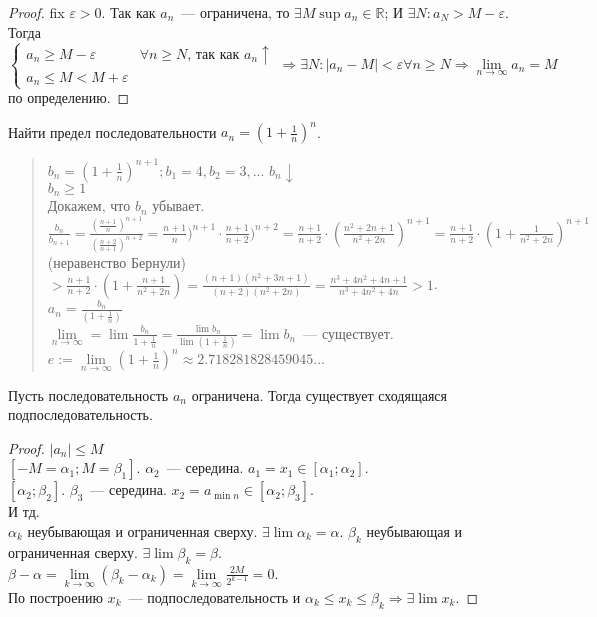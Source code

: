 \documentclass{article}
\begin{document}
	\begin{proof}
		fix $\varepsilon > 0$. Так как $a_n$~--- ограничена, то $\exists M  \sup a_n \in \mathbb{R}$; И $\exists N: a_N > M - \varepsilon$. \\
		Тогда $\begin{cases}
			a_n \geqslant M - \varepsilon & \forall n \geqslant N \text{, так как } a_n \uparrow \\
			a_n \leqslant M < M + \varepsilon
		\end{cases} \Rightarrow \exists N: |a_n - M| < \varepsilon \forall n \geqslant N \Rightarrow \lim\limits_{n \rightarrow \infty} a_n = M$ по определению.
	\end{proof}
	\begin{definition}
		Найти предел последовательности $a_n = (1 + \frac{1}{n})^n$.
		\begin{quote}
			$b_n = (1 + \frac{1}{n})^{n + 1}; b_1 = 4, b_2 = 3,...$ $b_n \downarrow$ \\
			$b_n \geqslant 1$ \\
			Докажем, что $b_n$ убывает. \\
			$\frac{b_n}{b_{n + 1}} = \frac{(\frac{n + 1}{n})^{n + 1}}{(\frac{n + 2}{n + 1})^{n + 2}} = \frac{n + 1}{n})^{n + 1} \cdot \frac{n + 1}{n + 2})^{n + 2} = \frac{n + 1}{n + 2} \cdot (\frac{n^2 + 2n + 1}{n^2 + 2n})^{n + 1} = \frac{n + 1}{n + 2} \cdot (1 + \frac{1}{n^2 + 2n})^{n + 1}$ (неравенство Бернули) $> \frac{n + 1}{n + 2} \cdot (1 + \frac{n + 1}{n^2 + 2n}) = \frac{(n + 1)(n^2 + 3n + 1)}{(n + 2)(n^2 + 2n)} = \frac{n^3 + 4n^2 + 4n + 1}{n^3 + 4n^2 + 4n} > 1$. \\
			$a_n = \frac{b_n}{(1 + \frac{1}{n})}$ \\
			$\lim\limits_{n \rightarrow \infty} = \lim \frac{b_n}{1 + \frac{1}{n}} = \frac{\lim b_n}{\lim (1 + \frac{1}{n})} = \lim b_n$~--- существует. \\
			$e := \lim\limits_{n \rightarrow \infty} (1 + \frac{1}{n})^n \approx 2.718281828459045...$
		\end{quote}
	\end{definition}
	\begin{theorem}[Вейерштрасса]
		Пусть последовательность $a_n$ ограничена. Тогда существует сходящаяся подпоследовательность.
	\end{theorem}
	\begin{proof}
		$|a_n| \leqslant M$ \\
		$[-M = \alpha_1; M = \beta_1]$. $\alpha_2$~--- середина. $a_1 = x_1 \in [\alpha_1; \alpha_2]$. \\
		$[\alpha_2; \beta_2]$. $\beta_3$~--- середина. $x_2 = a_{\min n} \in [\alpha_2; \beta_3]$. \\
		И тд. \\
		${\alpha_k}$ неубывающая и ограниченная сверху. $\exists \lim \alpha_k = \alpha$. ${\beta_k}$ неубывающая и ограниченная сверху. $\exists \lim \beta_k = \beta$. \\
		$\beta - \alpha = \lim \limits_{k \rightarrow \infty} (\beta_k - \alpha_k) = \lim \limits_{k \rightarrow \infty} \frac{2M}{2^{k - 1}} = 0$. \\
		По построению $x_k$~--- подпоследовательность и $\alpha_k \leqslant x_k \leqslant \beta_k \Rightarrow \exists \lim x_k$.
	\end{proof}
\end{document}
